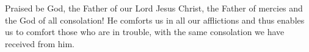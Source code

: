 \lettrine[lines=3]{P}{}raised be God, the Father of our Lord Jesus Christ, the Father of mercies and the God of all consolation! He comforts us in all our afflictions and thus enables us to comfort those who are in trouble, with the same consolation we have received from him.

